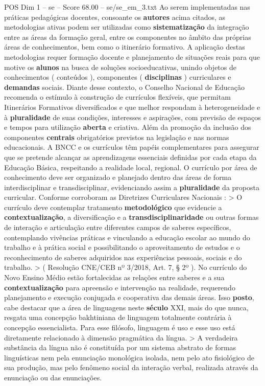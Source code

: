 \begin{textsample}{POS Dim 1 – se – Score 68.00 – se/se\_em\_3.txt}
Ao serem implementadas nas práticas pedagógicas docentes, consoante os \textbf{autores} acima citados, as metodologias ativas podem ser utilizadas como \textbf{sistematização} da integração entre as áreas da formação geral, entre os componentes no âmbito das próprias áreas de conhecimentos, bem como o itinerário formativo.
A aplicação destas metodologias requer formação docente e planejamento de situações reais para que motive os \textbf{alunos} na busca de soluções socioeducativas, unindo objetos de conhecimentos ( conteúdos ), componentes ( \textbf{disciplinas} ) curriculares e \textbf{demandas} sociais.
Diante desse contexto, o Conselho Nacional de Educação recomenda o estímulo à construção de currículos flexíveis, que permitam Itinerários Formativos diversificados e que melhor respondam à heterogeneidade e à \textbf{pluralidade} de suas condições, interesses e aspirações, com previsão de espaços e tempos para utilização \textbf{aberta} e criativa.
Além da promoção da inclusão dos componentes \textbf{centrais} obrigatórios previstos na legislação e nas normas educacionais.
A BNCC e os currículos têm papéis complementares para assegurar que se pretende alcançar as aprendizagens essenciais definidas por cada etapa da Educação Básica, respeitando a realidade local, regional.
O currículo por área de conhecimento deve ser organizado e planejado dentro das áreas de forma interdisciplinar e transdisciplinar, evidenciando assim a \textbf{pluralidade} da proposta curricular.
Conforme corroboram as Diretrizes Curriculares Nacionais : > O currículo deve contemplar tratamento \textbf{metodológico} que evidencie a \textbf{contextualização}, a diversificação e a \textbf{transdisciplinaridade} ou outras formas de interação e articulação entre diferentes campos de saberes específicos, contemplando vivências práticas e vinculando a educação escolar ao mundo do trabalho e à prática social e possibilitando o aproveitamento de estudos e o reconhecimento de saberes adquiridos nas experiências pessoais, sociais e do trabalho. > ( Resolução CNE/CEB nº 3/2018, Art. 7, § 2º ).
No currículo do Novo Ensino Médio estão fortalecidas as relações entre saberes e a sua \textbf{contextualização} para apreensão e intervenção na realidade, requerendo planejamento e execução conjugada e cooperativa das demais áreas.
Isso \textbf{posto}, cabe destacar que a área de linguagens neste \textbf{século} XXI, mais do que nunca, resgata uma concepção bakhtiniana de linguagem totalmente contrária à concepção essencialista.
Para esse filósofo, linguagem é uso e esse uso está diretamente relacionado à dimensão pragmática da língua. > A verdadeira substância da língua não é constituída por um sistema abstrato de formas linguísticas nem pela enunciação monológica isolada, nem pelo ato fisiológico de sua produção, mas pelo fenômeno social da interação verbal, realizada através da enunciação ou das enunciações.

\end{textsample}
